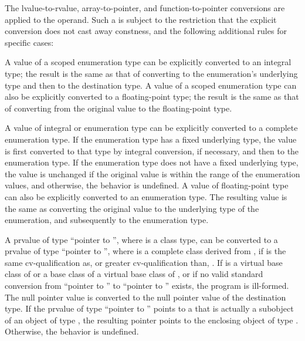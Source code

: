 \pnum
The lvalue-to-rvalue,
array-to-pointer, and
function-to-pointer conversions are applied to the
operand. Such a  is subject to the restriction that
the explicit conversion does not cast away
constness, and the following additional rules
for specific cases:

\pnum
A value of a scoped enumeration type
can be explicitly converted to an integral type;
the result is the same as that of converting
to the enumeration's underlying type and then to the destination type.
A value of a scoped enumeration type
can also be explicitly converted to a floating-point type;
the result is the same as that of converting
from the original value to the floating-point type.

\pnum
{}%
%
A value of integral or enumeration type can be explicitly converted to
a complete enumeration type.
If the enumeration type has a fixed underlying type,
the value is first converted to that type
by integral conversion, if necessary, and
then to the enumeration type.
If the enumeration type does not have a fixed underlying type,
the value is unchanged
if the original value is within the range
of the enumeration values, and
otherwise, the behavior is undefined.
A value of floating-point type can also be explicitly converted to an enumeration type.
The resulting value is the same as converting the original value to the
underlying type of the enumeration, and subsequently to
the enumeration type.

\pnum
{}%
%
A prvalue of type ``pointer to  '', where 
is a class type, can be converted to a prvalue of type ``pointer to
 '',
where  is a complete class derived
from ,
if  is the same cv-qualification as,
or greater cv-qualification than, .
If  is a virtual base class of  or
a base class of a virtual base class of , or
if no valid standard conversion from ``pointer to ''
to ``pointer to '' exists, the program is ill-formed.
The null pointer value is converted
to the null pointer value of the destination type. If the prvalue of type
``pointer to  '' points to a  that is
actually a subobject of an object of type , the resulting
pointer points to the enclosing object of type . Otherwise, the
behavior is undefined.


